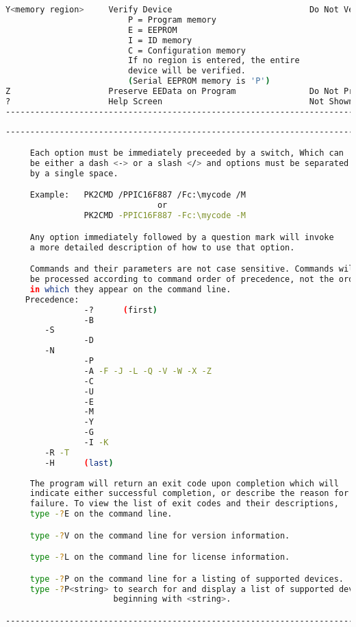 \begin{center}
\begin{lstlisting}[language=bash]
Y<memory region>     Verify Device                            Do Not Verify
                         P = Program memory
                         E = EEPROM
                         I = ID memory
                         C = Configuration memory
                         If no region is entered, the entire
                         device will be verified.
                         (Serial EEPROM memory is 'P')
Z                    Preserve EEData on Program               Do Not Preserve
?                    Help Screen                              Not Shown
-------------------------------------------------------------------------------
\end{lstlisting}
\newpage
\begin{lstlisting}[language=bash]
-------------------------------------------------------------------------------

     Each option must be immediately preceeded by a switch, Which can
     be either a dash <-> or a slash </> and options must be separated
     by a single space.

     Example:   PK2CMD /PPIC16F887 /Fc:\mycode /M
                               or
                PK2CMD -PPIC16F887 -Fc:\mycode -M

     Any option immediately followed by a question mark will invoke
     a more detailed description of how to use that option.

     Commands and their parameters are not case sensitive. Commands will
     be processed according to command order of precedence, not the order
     in which they appear on the command line. 
    Precedence:
                -?      (first)
                -B
        -S
                -D	
        -N
                -P
                -A -F -J -L -Q -V -W -X -Z
                -C
                -U
                -E
                -M
                -Y
                -G
                -I -K   
        -R -T
        -H      (last)
        
     The program will return an exit code upon completion which will
     indicate either successful completion, or describe the reason for
     failure. To view the list of exit codes and their descriptions,
     type -?E on the command line.

     type -?V on the command line for version information.

     type -?L on the command line for license information.

     type -?P on the command line for a listing of supported devices.
     type -?P<string> to search for and display a list of supported devices
                      beginning with <string>.

-------------------------------------------------------------------------------
\end{lstlisting}
\end{center}
\newpage
